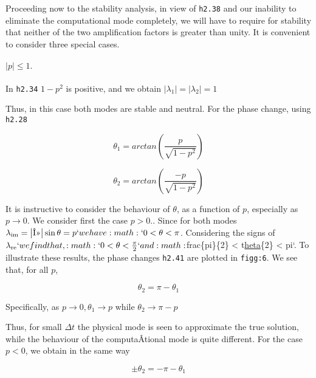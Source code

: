Proceeding now to the stability analysis, in view of \texttt{h2.38} and
our inability to eliminate the computational mode completely, we will
have to require for stability that neither of the two amplification
factors is greater than unity. It is convenient to consider three
special cases.

\paragraph{\texorpdfstring{\(\left| p \right| \leq 1.\)}{\textbackslash left\textbar{} p \textbackslash right\textbar{} \textbackslash leq 1.}}\label{left-p-right-leq-1.}

In \texttt{h2.34} \(1 - p^{2}\) is positive, and we obtain
\(\left| \lambda_{1} \right| = \left| \lambda_{2} \right| = 1\)

Thus, in this case both modes are stable and neutral. For the phase
change, using \texttt{h2.28}

{\[\theta_{1} = arctan\left( \frac{p}{\sqrt{1 - p^{2}}} \right)\]}

\[\theta_{2} = arctan\left( \frac{- p}{\sqrt{1 - p^{2}}} \right)\]

It is instructive to consider the behaviour of \(\theta\), as a function
of \(p\), especially as \(p \rightarrow 0.\) We consider first the case
\(p > 0.\). Since for both modes
\(\lambda_{\text{im}} = \left| \text{Î»} \right|\sin{\theta = p}`we
have :math:`0 < \theta < \pi\). Considering the signs of
\(\lambda_{\text{re}}`we find that,
:math:`0 < \theta < \frac{\pi}{2}`and
:math:\)frac\{pi\}\{2\} \textless{} t\href{}{heta}\{2\} \textless{} pi`.
To illustrate these results, the phase changes \texttt{h2.41} are
plotted in \texttt{figg:6}. We see that, for all \(p\),

\begin{figure}
\centering
{}
\caption{}
\end{figure}

\[\theta_{2} = \pi - \theta_{1}\]

Specifically, as \(p \rightarrow 0, \theta_{1} \rightarrow p\) while
\(\theta_{2} \rightarrow \pi - p\)

Thus, for small \(\Delta t\) the physical mode is seen to approximate
the true solution, while the behaviour of the computaÂ­tional mode is
quite different. For the case \(p < 0\), we obtain in the same way

\[\pm \theta_{2} = - \pi - \theta_{1}\]

